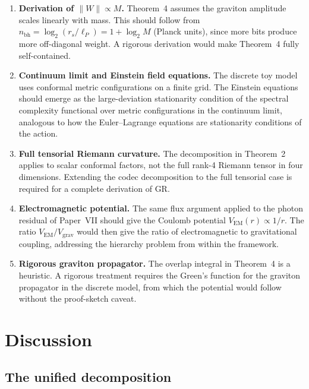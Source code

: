 \documentclass[11pt]{article}
\begin{document}
\begin{enumerate}

\item \textbf{Derivation of $\|W\| \propto M$.}
  Theorem~4 assumes the graviton amplitude scales linearly with mass.
  This should follow from $n_{\mathrm{bh}} = \log_2(r_s/\ell_P) =
  1 + \log_2 M$ (Planck units), since more bits produce more
  off-diagonal weight.
  A rigorous derivation would make Theorem~4 fully self-contained.

\item \textbf{Continuum limit and Einstein field equations.}
  The discrete toy model uses conformal metric configurations on a
  finite grid.
  The Einstein equations should emerge as the large-deviation
  stationarity condition of the spectral complexity functional over
  metric configurations in the continuum limit, analogous to how the
  Euler--Lagrange equations are stationarity conditions of the action.

\item \textbf{Full tensorial Riemann curvature.}
  The decomposition in Theorem~2 applies to scalar conformal factors,
  not the full rank-4 Riemann tensor in four dimensions.
  Extending the codec decomposition to the full tensorial case is
  required for a complete derivation of GR.

\item \textbf{Electromagnetic potential.}
  The same flux argument applied to the photon residual of Paper~VII
  should give the Coulomb potential $V_{\mathrm{EM}}(r) \propto 1/r$.
  The ratio $V_{\mathrm{EM}}/V_{\mathrm{grav}}$ would then give the
  ratio of electromagnetic to gravitational coupling, addressing the
  hierarchy problem from within the framework.

\item \textbf{Rigorous graviton propagator.}
  The overlap integral in Theorem~4 is a heuristic.
  A rigorous treatment requires the Green's function for the graviton
  propagator in the discrete model, from which the potential would
  follow without the proof-sketch caveat.

\end{enumerate}

\section{Discussion}
\label{sec:discussion}

\subsection{The unified decomposition}
\end{document}
